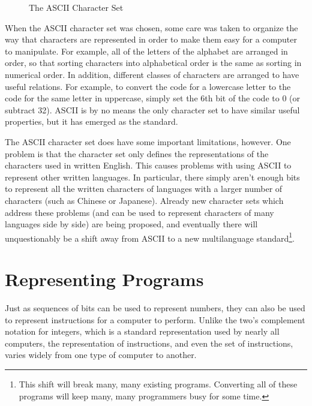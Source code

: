 \begin{figure}[hbt]
\caption{The ASCII Character Set}
\label{ascii}
\begin{center}

\end{center}
\end{figure}

When the ASCII character set was chosen, some care was taken to
organize the way that characters are represented in order to make
them easy for a computer to manipulate.  For example, all of the
letters of the alphabet are arranged in order, so that sorting
characters into alphabetical order is the same as sorting in
numerical order.
In addition, different classes of characters
are arranged to have useful relations.  For example, to convert
the code for a lowercase letter to the code for the same letter in
uppercase, simply set the 6th bit of the code to 0 (or subtract 32).
ASCII is by no means the only character set to have
similar useful properties, but it has emerged as the standard.

The ASCII character set does have some important limitations, however.
One problem is that the character set only defines the representations
of the characters used in written English.  This causes problems with
using ASCII to represent other written languages.  In particular,
there simply aren't enough bits to represent all the written characters
of languages with a larger number of characters (such as Chinese or
Japanese).  Already new character sets which address these problems
(and can be used to represent characters of many languages side
by side) are being proposed, and eventually there will unquestionably
be a shift away from ASCII to a new multilanguage standard\footnote{
        This shift will break many, many existing programs.  Converting
        all of these programs will keep many, many programmers busy
        for some time.}.


\section{Representing Programs}

Just as sequences of bits can be used to represent numbers, they can
also be used to represent instructions for a computer to perform. 
Unlike the two's complement notation for integers, which is a standard
representation used by nearly all computers, the representation of
instructions, and even the set of instructions, varies widely from one
type of computer to another.

